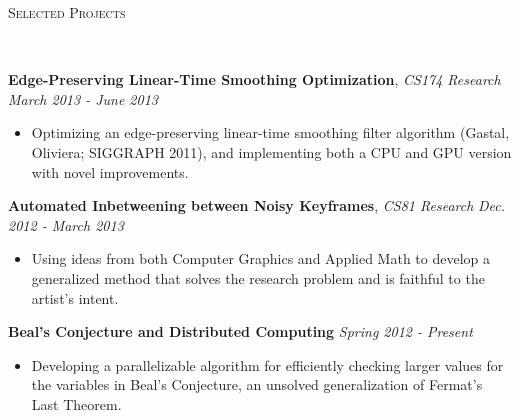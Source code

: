 \documentclass[9pt]{article}
\newenvironment{changemargin}[2]{%
  \begin{list}{}{%
    \setlength{\topsep}{0pt}%
    \setlength{\leftmargin}{#1}%
    \setlength{\rightmargin}{#2}%
    \setlength{\listparindent}{\parindent}%
    \setlength{\itemindent}{\parindent}%
    \setlength{\parsep}{\parskip}%
  }%
  \item[]}{\end{list}
}
\newcommand{\lineover}{
	\begin{changemargin}{-0.05in}{-0.05in}
		\vspace*{-8pt}
		\hrulefill \\
		\vspace*{-2pt}
	\end{changemargin}
}
\newcommand{\header}[1]{
	\begin{changemargin}{-0.5in}{-0.5in}
		\scshape{#1}\\
  	\lineover
	\end{changemargin}
}
\newenvironment{body} {
	\vspace*{-16pt}
	\begin{changemargin}{-0.25in}{-0.5in}
  }	
	{\end{changemargin}
}
\begin{document}




\header{Selected Projects}
\smallskip
\begin{body}
	\vspace{14pt}
	\textbf{Edge-Preserving Linear-Time Smoothing Optimization}, \emph{CS174 Research} \hfill \emph{March 2013 - June 2013} \\
	\begin{itemize} \itemsep -0pt
		\item Optimizing an edge-preserving linear-time smoothing filter algorithm (Gastal, Oliviera; SIGGRAPH 2011), and implementing both a CPU and GPU version with novel improvements.
	\end{itemize}
	\textbf{Automated Inbetweening between Noisy Keyframes}, \emph{CS81 Research} \hfill \emph{Dec. 2012 - March 2013} \\
	\begin{itemize} \itemsep -0pt
		\item Using ideas from both Computer Graphics and Applied Math to develop a generalized method that solves the research problem and is faithful to the artist's intent.
	\end{itemize}
	\textbf{Beal's Conjecture and Distributed Computing} \hfill \emph{Spring 2012 - Present}
	\begin{itemize} \itemsep -0pt
		\item Developing a parallelizable algorithm for efficiently checking larger values for the variables in Beal's Conjecture, an unsolved generalization of Fermat's Last Theorem.
	\end{itemize}

\end{body}

\end{document}
